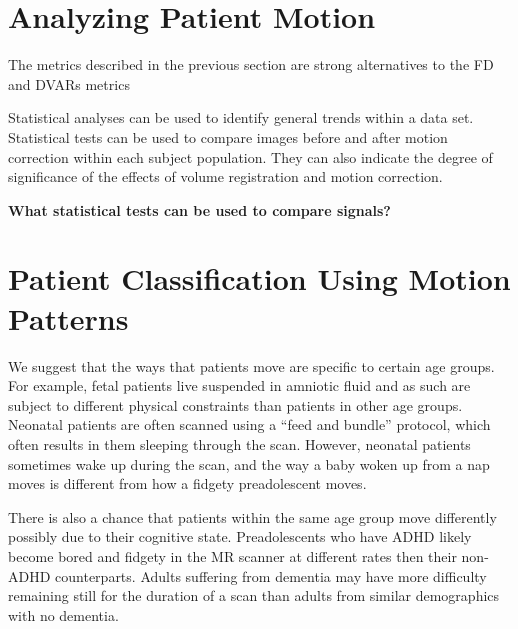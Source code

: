 
\section{Analyzing Patient Motion}

The metrics described in the previous section are strong alternatives to the FD and DVARs metrics 

Statistical analyses can be used to identify general trends within a data set. Statistical tests can be used to compare images before and after motion correction within each subject population. They can also indicate the degree of significance of the effects of volume registration and motion correction. 

\textbf{What statistical tests can be used to compare signals?}

\section{Patient Classification Using Motion Patterns} 


We suggest that the ways that patients move are specific to certain age groups. For example, fetal patients live suspended in amniotic fluid and as such are subject to different physical constraints than patients in other age groups. Neonatal patients are often scanned using a ``feed and bundle'' protocol, which often results in them sleeping through the scan. However, neonatal patients sometimes wake up during the scan, and the way a baby woken up from a nap moves is different from how a fidgety preadolescent moves. %

There is also a chance that patients within the same age group move differently possibly due to their cognitive state. Preadolescents who have ADHD likely become bored and fidgety in the MR scanner at different rates then their non-ADHD counterparts. Adults suffering from dementia may have more difficulty remaining still for the duration of a scan than adults from similar demographics with no dementia.

